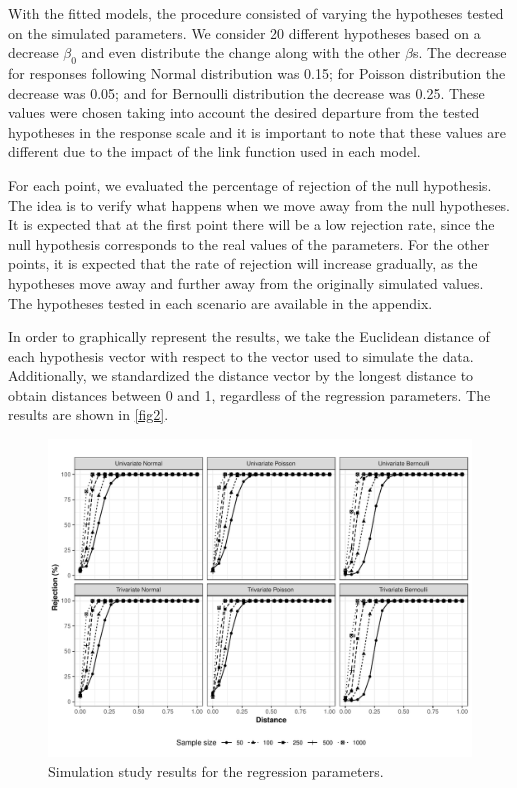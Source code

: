\documentclass[AMA,STIX1COL]{WileyNJD-v2}
\begin{document}
With the fitted models, the procedure consisted of varying the hypotheses tested on the simulated parameters. We consider 20 different hypotheses based on a decrease $\beta_0$ and even distribute the change along with the other $\beta$s. The decrease for responses following Normal distribution was 0.15; for Poisson distribution the decrease was 0.05; and for Bernoulli distribution the decrease was 0.25. These values were chosen taking into account the desired departure from the tested hypotheses in the response scale and it is important to note that these values are different due to the impact of the link function used in each model.

For each point, we evaluated the percentage of rejection of the null hypothesis. The idea is to verify what happens when we move away from the null hypotheses. It is expected that at the first point there will be a low rejection rate, since the null hypothesis corresponds to the real values of the parameters. For the other points, it is expected that the rate of rejection will increase gradually, as the hypotheses move away and further away from the originally simulated values. The hypotheses tested in each scenario are available in the appendix.
 
In order to graphically represent the results, we take the Euclidean distance of each hypothesis vector with respect to the vector used to simulate the data. Additionally, we standardized the distance vector by the longest distance to obtain distances between 0 and 1, regardless of the regression parameters. The results are shown in \autoref{fig2}.

\begin{figure}[h]
\centerline{\includegraphics[scale = 0.9]{FIGURE2}}
\caption{Simulation study results for the regression parameters.\label{fig2}}
\end{figure}
\end{document}
